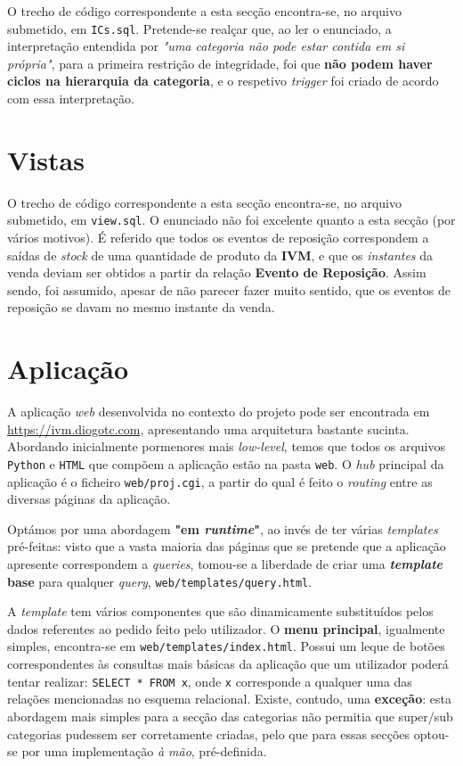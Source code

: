 \documentclass[12pt,a4paper]{article}
\begin{document}
  O trecho de código correspondente a esta secção encontra-se, no arquivo submetido,
  em \texttt{ICs.sql}. Pretende-se realçar que, ao ler o enunciado, a interpretação
  entendida por \textit{"uma categoria não pode estar contida em si própria"}, para
  a primeira restrição de integridade, foi que \textbf{não podem haver ciclos na
  hierarquia da categoria}, e o respetivo \textit{trigger} foi criado de acordo
  com essa interpretação.

  \section*{Vistas}

  O trecho de código correspondente a esta secção encontra-se, no arquivo submetido,
  em \texttt{view.sql}. O enunciado não foi excelente quanto a esta secção (por vários motivos).
  É referido que todos os eventos de reposição correspondem a saídas de \textit{stock} de uma
  quantidade de produto da \textbf{IVM}, e que os \textit{instantes} da venda
  deviam ser obtidos a partir da relação \textbf{Evento de Reposição}. Assim sendo,
  foi assumido, apesar de não parecer fazer muito sentido, que os eventos de reposição
  se davam no mesmo instante da venda.

  \section*{Aplicação}

  A aplicação \textit{web} desenvolvida no contexto do projeto pode ser encontrada
  em \url{https://ivm.diogotc.com}, apresentando uma arquitetura bastante sucinta.
  Abordando inicialmente pormenores mais \textit{low-level}, temos que todos os arquivos
  \texttt{Python} e \texttt{HTML} que compõem a aplicação estão na pasta \texttt{web}.
  O \textit{hub} principal da aplicação é o ficheiro \texttt{web/proj.cgi}, a partir do qual
  é feito o \textit{routing} entre as diversas páginas da aplicação.

  Optámos por uma abordagem \textbf{"em \textit{runtime}"}, ao invés de ter várias \textit{templates}
  pré-feitas: visto que a vasta maioria das páginas que se pretende que a aplicação
  apresente correspondem a \textit{queries}, tomou-se a liberdade de criar uma
  \textbf{\textit{template} base} para qualquer \textit{query}, \texttt{web/templates/query.html}.
  
  A \textit{template} tem vários componentes que são dinamicamente substituídos
  pelos dados referentes ao pedido feito pelo utilizador. O \textbf{menu principal},
  igualmente simples, encontra-se em \texttt{web/templates/index.html}. Possui um
  leque de botões correspondentes às consultas mais básicas da aplicação que um
  utilizador poderá tentar realizar: \texttt{SELECT * FROM x}, onde \texttt{x} corresponde a qualquer
  uma das relações mencionadas no esquema relacional. Existe, contudo, uma \textbf{exceção}:
  esta abordagem mais simples para a secção das categorias não permitia que
  super/sub categorias pudessem ser corretamente criadas, pelo que para essas secções
  optou-se por uma implementação \textit{à mão}, pré-definida.
  
\end{document}
